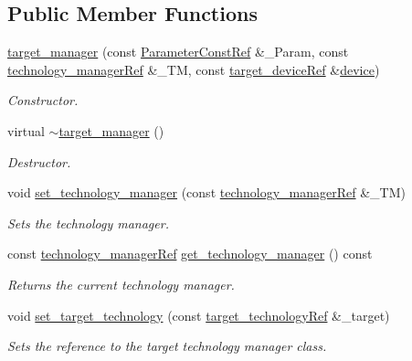 \subsection*{Public Member Functions}
\begin{DoxyCompactItemize}
\item 
\hyperlink{classtarget__manager_abdffc4b87550d63ae0e389b69c8de199}{target\+\_\+manager} (const \hyperlink{Parameter_8hpp_a37841774a6fcb479b597fdf8955eb4ea}{Parameter\+Const\+Ref} \&\+\_\+\+Param, const \hyperlink{technology__manager_8hpp_a4b9ecd440c804109c962654f9227244e}{technology\+\_\+manager\+Ref} \&\+\_\+\+TM, const \hyperlink{target__device_8hpp_acedb2b7a617e27e6354a8049fee44eda}{target\+\_\+device\+Ref} \&\hyperlink{classtarget__manager_af678484b7801324da5d10ec140136c7f}{device})
\begin{DoxyCompactList}\small\item\em Constructor. \end{DoxyCompactList}\item 
virtual \hyperlink{classtarget__manager_a0242b720a0790005dc499fbc30c677e2}{$\sim$target\+\_\+manager} ()
\begin{DoxyCompactList}\small\item\em Destructor. \end{DoxyCompactList}\item 
void \hyperlink{classtarget__manager_a90e14edbec3c7adda47082b7e13690e2}{set\+\_\+technology\+\_\+manager} (const \hyperlink{technology__manager_8hpp_a4b9ecd440c804109c962654f9227244e}{technology\+\_\+manager\+Ref} \&\+\_\+\+TM)
\begin{DoxyCompactList}\small\item\em Sets the technology manager. \end{DoxyCompactList}\item 
const \hyperlink{technology__manager_8hpp_a4b9ecd440c804109c962654f9227244e}{technology\+\_\+manager\+Ref} \hyperlink{classtarget__manager_ab9bc56ace0f343c91dc10e9ca40a91e3}{get\+\_\+technology\+\_\+manager} () const
\begin{DoxyCompactList}\small\item\em Returns the current technology manager. \end{DoxyCompactList}\item 
void \hyperlink{classtarget__manager_a2efdd4db15ea0230ea28fcad6a5bac53}{set\+\_\+target\+\_\+technology} (const \hyperlink{target__technology_8hpp_a16af97aadc4eb998c2c9ec7fba5ccecd}{target\+\_\+technology\+Ref} \&\+\_\+target)
\begin{DoxyCompactList}\small\item\em Sets the reference to the target technology manager class. \end{DoxyCompactList}\item 

\end{DoxyCompactItemize}
